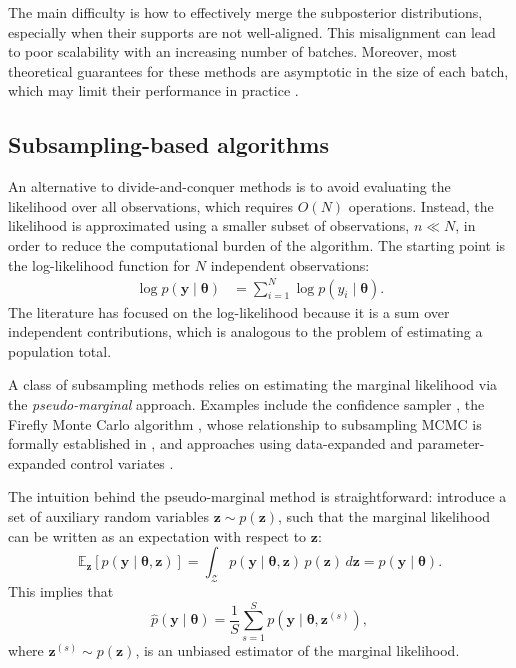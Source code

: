 The main difficulty is how to effectively merge the subposterior distributions, especially when their supports are not well-aligned. This misalignment can lead to poor scalability with an increasing number of batches. Moreover, most theoretical guarantees for these methods are asymptotic in the size of each batch, which may limit their performance in practice \cite{bardenet2017markov}.

\subsection{Subsampling-based algorithms}

An alternative to divide-and-conquer methods is to avoid evaluating the likelihood over all observations, which requires \( O(N) \) operations. Instead, the likelihood is approximated using a smaller subset of observations, \( n \ll N \), in order to reduce the computational burden of the algorithm. The starting point is the log-likelihood function for \( N \) independent observations:
\begin{align*}
	\log p(\mathbf{y} \mid \boldsymbol{\theta}) &= \sum_{i=1}^N \log p(y_i \mid \boldsymbol{\theta}).
\end{align*}
The literature has focused on the log-likelihood because it is a sum over independent contributions, which is analogous to the problem of estimating a population total.

A class of subsampling methods relies on estimating the marginal likelihood via the \textit{pseudo-marginal} approach. Examples include the confidence sampler \cite{bardenet2014towards}, the Firefly Monte Carlo algorithm \cite{Maclaurin2015}, whose relationship to subsampling MCMC is formally established in \cite{bardenet2017markov}, and approaches using data-expanded and parameter-expanded control variates \cite{quiroz2019speeding}.

The intuition behind the pseudo-marginal method is straightforward: introduce a set of auxiliary random variables \( \mathbf{z} \sim p(\mathbf{z}) \), such that the marginal likelihood can be written as an expectation with respect to \( \mathbf{z} \):
\[
\mathbb{E}_{\mathbf{z}}[p(\mathbf{y} \mid \boldsymbol{\theta}, \mathbf{z})] = \int_{\mathcal{Z}} p(\mathbf{y} \mid \boldsymbol{\theta}, \mathbf{z}) \, p(\mathbf{z}) \, d\mathbf{z} = p(\mathbf{y} \mid \boldsymbol{\theta}).
\]
This implies that
\[
\hat{p}(\mathbf{y} \mid \boldsymbol{\theta}) = \frac{1}{S} \sum_{s=1}^S p(\mathbf{y} \mid \boldsymbol{\theta}, \mathbf{z}^{(s)}),
\]
where \( \mathbf{z}^{(s)} \sim p(\mathbf{z}) \), is an unbiased estimator of the marginal likelihood.

